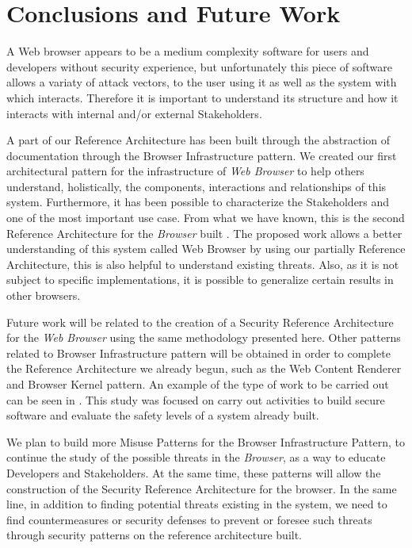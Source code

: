 \documentclass{sig-alternate-05-2015}
\begin{document}
\section*{Conclusions and Future Work}
A Web browser appears to be a medium complexity software for users and developers without security experience, but unfortunately this piece of software allows a variaty of attack vectors, to the user using it as well as the system with which interacts. Therefore it is important to understand its structure and how it interacts with internal and/or external Stakeholders.

A part of our Reference Architecture has been built through the abstraction of documentation through the Browser Infrastructure pattern. We created our first architectural pattern for the infrastructure of \textit{Web Browser} to help others understand, holistically, the components, interactions and relationships of this system. Furthermore, it has been possible to characterize the Stakeholders and one of the most important use case. From what we have known, this is the second Reference Architecture for the \textit{Browser} built \cite{2005-grosskurth-browser-refarch}. The proposed work allows a better understanding of this system called Web Browser by using our partially Reference Architecture, this is also helpful to understand existing threats. Also, as it is not subject to specific implementations, it is possible to generalize certain results in other browsers.

Future work will be related to the creation of a Security Reference Architecture for the \textit{Web Browser} using the same methodology presented here. Other patterns related to Browser Infrastructure pattern will be obtained in order to complete the Reference Architecture we already begun, such as the Web Content Renderer and Browser Kernel pattern. An example of the type of work to be carried out can be seen in \cite{Fernandez2015}. This study was focused on carry out activities to build secure software and evaluate the safety levels of a system already built.

We plan to build more Misuse Patterns for the Browser Infrastructure Pattern, to continue the study of the possible threats in the \textit{Browser}, as a way to educate Developers and Stakeholders. At the same time, these patterns will allow the construction of the Security Reference Architecture for the browser. In the same line, in addition to finding potential threats existing in the system, we need to find countermeasures or security defenses to prevent or foresee such threats through security patterns on the reference architecture built.

  

\end{document}
